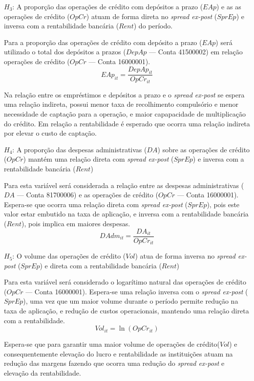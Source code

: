 \documentclass[12pt,12pt,openright,oneside,a4paper,chapter=TITLE,section=TITLE,subsection=TITLE,subsubsection=TITLE,english,french,spanish,portugues,sumario=tradicional]{abntex2}
\begin{document}
\(H_{3}\): A proporção das operações de crédito com depósitos a prazo (\(EAp\)) e as as operações de crédito (\(OpCr\)) atuam de forma direta no \emph{spread ex-post} (\(SprEp\)) e inversa com a rentabilidade bancária (\(Rent\)) do período.

Para a proporção das operações de crédito com depósito a prazo (\(EAp\)) será utilizado o total dos depósitos a prazos (\(DepAp\) --- Conta 41500002) em relação operações de crédito (\(OpCr\) --- Conta 16000001).
\[
EAp_{it} = \frac{DepAp_{it}}{OpCr_{it}}
\]

Na relação entre os empréstimos e depósitos a prazo e o \emph{spread ex-post} se espera uma relação indireta, possui menor taxa de recolhimento compulsório e menor necessidade de captação para a operação, e maior capapacidade de multiplicação do crédito. Em relação a rentabilidade é esperado que ocorra uma relação indireta por elevar o custo de captação.

\(H_{4}\): A proporção das despesas administrativas (\(DA\)) sobre as operações de crédito (\(OpCr\)) mantém uma relação direta com \emph{spread ex-post} (\(SprEp\)) e inversa com a rentabilidade bancária (\(Rent\))

Para esta variável será considerada a relação entre as despesas administrativas (\(DA\) --- Conta 81700006) e as operações de crédito (\(OpCr\) --- Conta 16000001). Espera-se que ocorra uma relação direta com \emph{spread ex-post} (\(SprEp\)), pois este valor estar embutido na taxa de aplicação, e inversa com a rentabilidade bancária (\(Rent\)), pois implica em maiores despesas.
\[
DAdm_{it} = \frac{DA_{it}}{OpCr_{it}}
\]

\(H_{5}\): O volume das operações de crédito (\(Vol\)) atua de forma inversa no \emph{spread ex-post} (\(SprEp\)) e direta com a rentabilidade bancária (\(Rent\))

Para esta variável será considerado o logarítimo natural das operações de crédito (\(OpCr\) --- Conta 16000001). Espera-se uma relação inversa com o \emph{spread ex-post} (\(SprEp\)), uma vez que um maior volume durante o período permite redução na taxa de aplicação, e redução de custos operacionais, mantendo uma relação direta com a rentabilidade.
\[
Vol_{it} = \ln(OpCr_{it})
\]

Espera-se que para garantir uma maior volume de operações de crédito(\(Vol\)) e consequentemente elevação do lucro e rentabilidade as instituições atuam na redução das margens fazendo que ocorra uma redução do \emph{spread ex-post} e elevação da rentabilidade.
\end{document}
